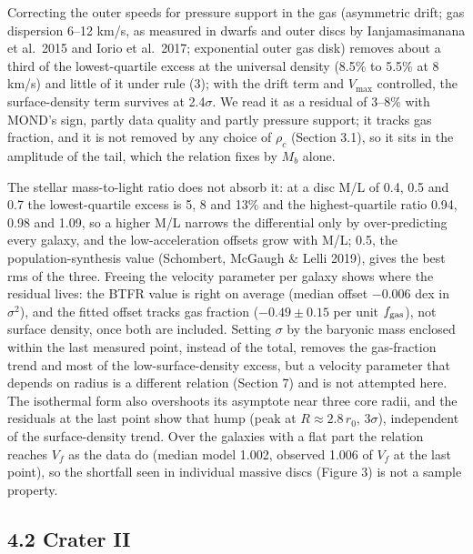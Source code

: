 \documentclass[
  10pt,
]{article}
\begin{document}
Correcting the outer speeds for pressure support in the gas (asymmetric drift; gas dispersion 6--12 km/s, as measured in dwarfs and outer discs by Ianjamasimanana et al.~2015 and Iorio et al.~2017; exponential outer gas disk) removes about a third of the lowest-quartile excess at the universal density (8.5\% to 5.5\% at 8 km/s) and little of it under rule (3); with the drift term and $V_{\max}$ controlled, the surface-density term survives at 2.4$\sigma$. We read it as a residual of 3--8\% with MOND's sign, partly data quality and partly pressure support; it tracks gas fraction, and it is not removed by any choice of $\rho_c$ (Section 3.1), so it sits in the amplitude of the tail, which the relation fixes by $M_b$ alone.

The stellar mass-to-light ratio does not absorb it: at a disc M/L of 0.4, 0.5 and 0.7 the lowest-quartile excess is 5, 8 and 13\% and the highest-quartile ratio 0.94, 0.98 and 1.09, so a higher M/L narrows the differential only by over-predicting every galaxy, and the low-acceleration offsets grow with M/L; 0.5, the population-synthesis value (Schombert, McGaugh \& Lelli 2019), gives the best rms of the three. Freeing the velocity parameter per galaxy shows where the residual lives: the BTFR value is right on average (median offset $-0.006$ dex in $\sigma^2$), and the fitted offset tracks gas fraction ($-0.49\pm0.15$ per unit $f_{\rm gas}$), not surface density, once both are included. Setting $\sigma$ by the baryonic mass enclosed within the last measured point, instead of the total, removes the gas-fraction trend and most of the low-surface-density excess, but a velocity parameter that depends on radius is a different relation (Section 7) and is not attempted here. The isothermal form also overshoots its asymptote near three core radii, and the residuals at the last point show that hump (peak at $R\approx2.8\,r_0$, $3\sigma$), independent of the surface-density trend. Over the galaxies with a flat part the relation reaches $V_f$ as the data do (median model 1.002, observed 1.006 of $V_f$ at the last point), so the shortfall seen in individual massive discs (Figure 3) is not a sample property.


\subsection{4.2 Crater II}
\end{document}
